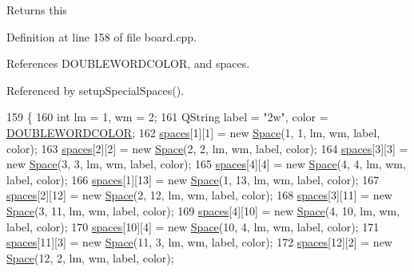 \begin{DoxyReturn}{Returns}
this 
\end{DoxyReturn}


Definition at line 158 of file board.\-cpp.



References D\-O\-U\-B\-L\-E\-W\-O\-R\-D\-C\-O\-L\-O\-R, and spaces.



Referenced by setup\-Special\-Spaces().


\begin{DoxyCode}
159 \{
160     \textcolor{keywordtype}{int} lm = 1, wm = 2;
161     QString label = \textcolor{stringliteral}{"2w"}, color = \hyperlink{board_8h_a10e5d0be9a98901f142735d07e5537f6}{DOUBLEWORDCOLOR};
162     \hyperlink{class_board_a73b12248ddb6ee3adc24f4458d8661c2}{spaces}[1][1] = \textcolor{keyword}{new} \hyperlink{class_space}{Space}(1, 1, lm, wm, label, color);
163     \hyperlink{class_board_a73b12248ddb6ee3adc24f4458d8661c2}{spaces}[2][2] = \textcolor{keyword}{new} \hyperlink{class_space}{Space}(2, 2, lm, wm, label, color);
164     \hyperlink{class_board_a73b12248ddb6ee3adc24f4458d8661c2}{spaces}[3][3] = \textcolor{keyword}{new} \hyperlink{class_space}{Space}(3, 3, lm, wm, label, color);
165     \hyperlink{class_board_a73b12248ddb6ee3adc24f4458d8661c2}{spaces}[4][4] = \textcolor{keyword}{new} \hyperlink{class_space}{Space}(4, 4, lm, wm, label, color);
166     \hyperlink{class_board_a73b12248ddb6ee3adc24f4458d8661c2}{spaces}[1][13] = \textcolor{keyword}{new} \hyperlink{class_space}{Space}(1, 13, lm, wm, label, color);
167     \hyperlink{class_board_a73b12248ddb6ee3adc24f4458d8661c2}{spaces}[2][12] = \textcolor{keyword}{new} \hyperlink{class_space}{Space}(2, 12, lm, wm, label, color);
168     \hyperlink{class_board_a73b12248ddb6ee3adc24f4458d8661c2}{spaces}[3][11] = \textcolor{keyword}{new} \hyperlink{class_space}{Space}(3, 11, lm, wm, label, color);
169     \hyperlink{class_board_a73b12248ddb6ee3adc24f4458d8661c2}{spaces}[4][10] = \textcolor{keyword}{new} \hyperlink{class_space}{Space}(4, 10, lm, wm, label, color);
170     \hyperlink{class_board_a73b12248ddb6ee3adc24f4458d8661c2}{spaces}[10][4] = \textcolor{keyword}{new} \hyperlink{class_space}{Space}(10, 4, lm, wm, label, color);
171     \hyperlink{class_board_a73b12248ddb6ee3adc24f4458d8661c2}{spaces}[11][3] = \textcolor{keyword}{new} \hyperlink{class_space}{Space}(11, 3, lm, wm, label, color);
172     \hyperlink{class_board_a73b12248ddb6ee3adc24f4458d8661c2}{spaces}[12][2] = \textcolor{keyword}{new} \hyperlink{class_space}{Space}(12, 2, lm, wm, label, color);

\end{DoxyCode}
